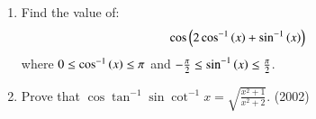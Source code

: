 \begin{enumerate}[label=\thesubsection.\arabic*,ref=\thesubsection.\theenumi]
\begin{enumerate}
\end{enumerate}
\item Find the value of: 
\begin{align*}
\cos \left(2\cos ^{-1}\left(x\right)+\sin ^{-1}\left(x\right)\right) 
\end{align*}
where $0\le \cos ^{-1}\left(x\right) \le \pi$ and $-\frac{\pi}{2}\le \sin ^{-1}\left(x\right) \le\frac{\pi}{2}$.
\hfill {}
	\item{
			Prove that $\cos \tan^{-1} \sin \cot^{-1} x = \sqrt{\frac{x^2 + 1}{x^2 + 2}}$. \hfill (2002)
		}
\end{enumerate}
